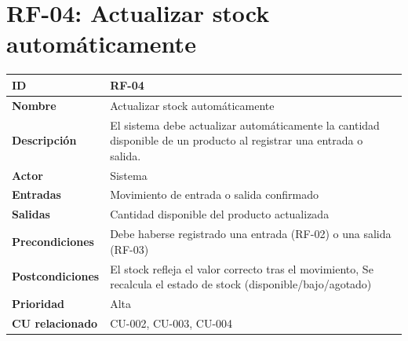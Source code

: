 \documentclass{article}
\begin{document}
\section*{RF-04: Actualizar stock automáticamente}
\begin{center}
\renewcommand{\arraystretch}{1.4}
\begin{tabular}{|L{4cm}|L{12cm}|}
\hline
\textbf{ID} & RF-04 \\
\hline
\textbf{Nombre} & Actualizar stock automáticamente \\
\hline
\textbf{Descripción} & El sistema debe actualizar automáticamente la cantidad disponible de un producto al registrar una entrada o salida. \\
\hline
\textbf{Actor} & Sistema \\
\hline
\textbf{Entradas} & Movimiento de entrada o salida confirmado \\
\hline
\textbf{Salidas} & Cantidad disponible del producto actualizada \\
\hline
\textbf{Precondiciones} & Debe haberse registrado una entrada (RF-02) o una salida (RF-03) \\
\hline
\textbf{Postcondiciones} & El stock refleja el valor correcto tras el movimiento, Se recalcula el estado de stock (disponible/bajo/agotado) \\
\hline
\textbf{Prioridad} & Alta \\
\hline
\textbf{CU relacionado} & CU-002, CU-003, CU-004 \\
\hline
\end{tabular}
\end{center}
\end{document}
